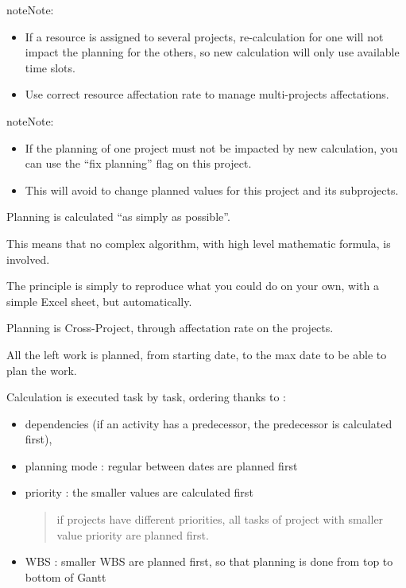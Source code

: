 \documentclass[letterpaper,10pt,english]{sphinxmanual}
\begin{document}
\begin{notice}{note}{Note:}\begin{itemize}
\item {} 
If a resource is assigned to several projects, re-calculation for one will not impact the planning for the others, so new calculation will only use available time slots.

\item {} 
Use correct resource affectation rate to manage multi-projects affectations.

\end{itemize}
\end{notice}

\begin{notice}{note}{Note:}\begin{itemize}
\item {} 
If the planning of one project must not be impacted by new calculation, you can use the “fix planning” flag on this project.

\item {} 
This will avoid to change planned values for this project and its subprojects.

\end{itemize}
\end{notice}

Planning is calculated “as simply as possible”.

This means that no complex algorithm, with high level mathematic formula, is involved.

The principle is simply to reproduce what you could do on your own, with a simple Excel sheet, but automatically.

Planning is Cross-Project, through affectation rate on the projects.

All the left work is planned, from starting date, to the max date to be able to plan the work.

Calculation is executed task by task, ordering thanks to :
\begin{itemize}
\item {} 
dependencies (if an activity has a predecessor, the predecessor is calculated first),

\item {} 
planning mode : regular between dates are planned first

\item {} 
priority : the smaller values are calculated first
\begin{quote}

if projects have different priorities, all tasks of project with smaller value priority are planned first.
\end{quote}

\item {} 
WBS : smaller WBS are planned first, so that planning is done from top to bottom of Gantt

\end{itemize}
\end{document}
